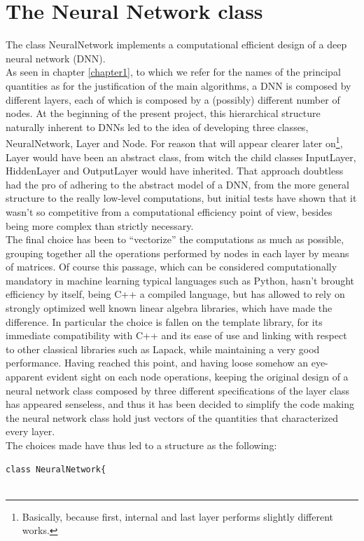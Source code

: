 \documentclass[12pt, a4paper]{report}
\theoremstyle{definition}
\begin{document}
{\section{The Neural Network class}
The class NeuralNetwork implements a computational efficient design of a deep neural network (DNN).\\
As seen in chapter \ref{chapter1}, to which we refer for the names of the principal quantities as for the justification of the main algorithms, a DNN is composed by different layers, each of which is composed by a (possibly) different number of nodes. At the beginning of the present project, this hierarchical structure naturally inherent to DNNs led to the idea of developing three classes, NeuralNetwork, Layer and Node. For reason that will appear clearer later on\footnote{Basically, because first, internal and last layer performs slightly different works.}, Layer would have been an abstract class, from witch the child classes InputLayer, HiddenLayer and OutputLayer would have inherited. That approach doubtless had the pro of adhering to the abstract model of a DNN, from the more general structure to the really low-level computations, but initial tests have shown that it wasn't so competitive from a computational efficiency point of view, besides being more complex than strictly necessary.\\
The final choice has been to ``vectorize'' the computations as much as possible, grouping together all the operations performed by nodes in each layer by means of matrices.
Of course this passage, which can be considered computationally mandatory in machine learning typical languages such as Python, hasn't brought efficiency by itself, being C++ a compiled language, but has allowed to rely on strongly optimized well known linear algebra libraries, which have made the difference. In particular the choice is fallen on the \cite{eigen} template library, for its immediate compatibility with C++ and its ease of use and linking with respect to other classical libraries such as Lapack, while maintaining a very good performance.
Having reached this point, and having loose somehow an eye-apparent evident sight on each node operations, keeping the original design of a neural network class composed by three different specifications of the layer class has appeared senseless, and thus it has been decided to simplify the code making the neural network class hold just vectors of the quantities that characterized every layer. \\
The choices made have thus led to a structure as the following:
\begin{lstlisting}[frame=single, name=neuralnet, showstringspaces=false]
class NeuralNetwork{


\end{lstlisting}}
\end{document}
